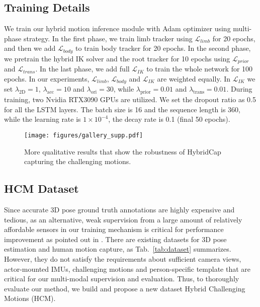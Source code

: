 \documentclass[letterpaper]{article} \usepackage{aaai23}  \usepackage{times}  \usepackage{helvet}  \usepackage{courier}  \usepackage[hyphens]{url}  \usepackage{graphicx} \urlstyle{rm} \def\UrlFont{\rm}  \usepackage{natbib}  \usepackage{caption} \frenchspacing  \setlength{\pdfpagewidth}{8.5in}  \setlength{\pdfpageheight}{11in}  \usepackage{algorithm}
\begin{document}
\vspace{-2mm}
\subsection{Training Details}

We train our hybrid motion inference module with Adam optimizer \cite{kingma2014adam} using multi-phase strategy. In the first phase, we train limb tracker using $\mathcal{L}_{limb}$ for 20 epochs, and then we add $\mathcal{L}_{body}$ to train body tracker for 20 epochs. In the second phase, we pretrain the hybrid IK solver and the root tracker for 10 epochs using $\mathcal{L}_{prior}$ and $\mathcal{L}_{trans}$. In the last phase, we add full $\mathcal{L}_{IK}$ to train the whole network for 100 epochs. 
In our experiments, $\mathcal{L}_{limb}$, $\mathcal{L}_{body}$ and $\mathcal{L}_{IK}$ are weighted equally. In $\mathcal{L}_{IK}$ we set $\lambda_{\mathrm{2D}}=1$, $\lambda_{\mathrm{acc}}=10$ and $\lambda_{\mathrm{ori}}=30$, while $\lambda_{\mathrm{prior}}=0.01$ and $\lambda_{\mathrm{trans}}=0.01$.
During training, two Nvidia RTX3090 GPUs are utilized. We set the dropout ratio as 0.5 for all the LSTM layers. The batch size is 16 and the sequence length is 360, while the learning rate is $1\times10^{-4}$, the decay rate is 0.1 (final 50 epochs). 

 \vspace{-2mm}

\begin{figure*}[t]
	\centering
	\texttt{[image: figures/gallery\_supp.pdf]}
	\caption{More qualitative results that show the robustness of HybridCap capturing the challenging motions.}
	\label{fig:gallery}
\end{figure*}


\subsection{HCM Dataset}

Since accurate 3D pose ground truth annotations are highly expensive and tedious, as an alternative, weak supervision from a large amount of relatively affordable sensors in our training mechanism is critical for performance improvement as pointed out in \cite{DeepCap_CVPR2020}. 
There are existing datasets for 3D pose estimation and human motion capture, as Tab.~\ref{tab:dataset} summarizes.
However, they do not satisfy the requirements about sufficient camera views, actor-mounted IMUs, challenging motions and person-specific template that are critical for our multi-modal supervision and evaluation.
Thus, to thoroughly evaluate our method, we build and propose a new dataset Hybrid Challenging Motions (HCM). 
\end{document}

